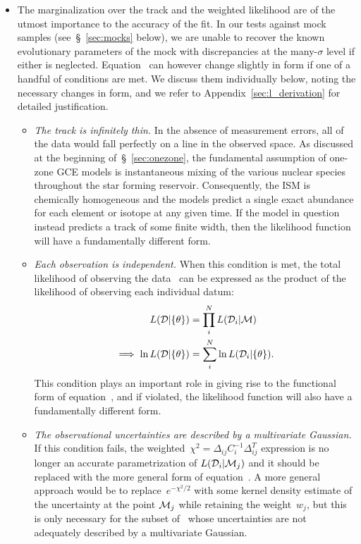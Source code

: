 \documentclass[ms.tex]{subfiles}
\begin{document}
\begin{itemize}
	\item The marginalization over the track and the weighted likelihood are
	of the utmost importance to the accuracy of the fit.
	In our tests against mock samples (see~\S~\ref{sec:mocks} below), we are
	unable to recover the known evolutionary parameters of the mock with
	discrepancies at the many-$\sigma$ level if either is neglected.
	Equation~ can however change slightly in form if one of
	a handful of conditions are met.
	We discuss them individually below, noting the necessary changes in form,
	and we refer to Appendix~\ref{sec:l_derivation} for detailed justification.
	\begin{itemize}
		\item \textit{The track is infinitely thin.}
		In the absence of measurement errors, all of the data would fall
		perfectly on a line in the observed space.
		As discussed at the beginning of~\S~\ref{sec:onezone}, the
		fundamental assumption of one-zone GCE models is instantaneous mixing
		of the various nuclear species throughout the star forming reservoir.
		Consequently, the ISM is chemically homogeneous and the models predict
		a single exact abundance for each element or isotope at any given time.
		If the model in question instead predicts a track of some finite
		width, then the likelihood function will have a fundamentally different
		form.

		\item \textit{Each observation is independent.}
		When this condition is met, the total likelihood of observing the
		data~ can be expressed as the product of the likelihood of
		observing each individual datum:
		\begin{subequations}\begin{align}
		L(\mathcal{D} | \{\theta\}) &= \prod_i^N L(\mathcal{D}_i | \mathcal{M})
		\\
		\implies \ln L(\mathcal{D} | \{\theta\}) &= \sum_i^N \ln
		L(\mathcal{D}_i | \{\theta\}).
		\end{align}\end{subequations}
		This condition plays an important role in giving rise to the
		functional form of equation~, and if violated, the
		likelihood function will also have a fundamentally different form.

		\item \textit{The observational uncertainties are described by a
		multivariate Gaussian.}
		If this condition fails, the weighted~$\chi^2 = \Delta_{ij} C_i^{-1}
		\Delta_{ij}^T$ expression is no longer an accurate parametrization of
		$L(\mathcal{D}_i | \mathcal{M}_j)$ and it should be replaced with the
		more general form of equation~.
		A more general approach would be to replace~$e^{-\chi^2/2}$ with
		some kernel density estimate of the uncertainty at the point
		$\mathcal{M}_j$ while retaining the weight~$w_j$, but this is only
		necessary for the subset of~ whose uncertainties are not
		adequately described by a multivariate Gaussian.


\end{itemize}
\end{itemize}
\end{document}
